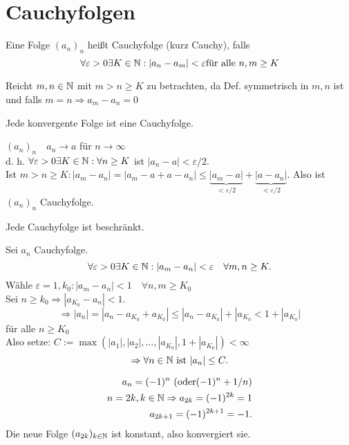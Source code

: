 \section{Cauchyfolgen}
\begin{defi}[Cauchyfolge]
	Eine Folge \((a_n)_n\) heißt Cauchyfolge (kurz Cauchy), falls
	\[\forall \varepsilon>0 \exists K\in\mathbb{N}: |a_n-a_m| < \varepsilon \text{für alle } n,m\geq K \]
\end{defi}
\begin{bem}
	Reicht \(m,n\in\mathbb{N}\) mit \( m>n\geq K \) zu betrachten, da Def. symmetrisch in \(m,n\) ist und falls \(m=n \Rightarrow a_m-a_n=0\)
\end{bem}
\begin{lem}
	Jede konvergente Folge ist eine Cauchyfolge.
\end{lem}
\begin{bew}
	\( (a_n)_n \quad a_n \rightarrow a \) für \(n\rightarrow\infty\) \\
	d. h. \( \forall \varepsilon > 0 \exists K \in \mathbb{N}: \forall n\geq K \) ist \( |a_n-a| < \varepsilon/2 \).\\
	Ist \(m>n\geq K: |a_m -a_n| = |a_m-a+a-a_n| \leq \underbrace{|a_m-a|}_{<\varepsilon/2} + \underbrace{ |a-a_n| }_{<\varepsilon/2}. \) Also ist \((a_n)_n\) Cauchyfolge.
\end{bew}
\begin{lem}
	Jede Cauchyfolge ist beschränkt.
\end{lem}
\begin{bew}
	Sei \(a_n\) Cauchyfolge. 
	\[ \forall \varepsilon > 0 \exists K\in\mathbb{N}:|a_m-a_n| < \varepsilon \quad \forall m,n\geq K. \]
	Wähle \(\varepsilon = 1, k_0: |a_m-a_n| < 1 \quad \forall n,m\geq K_0 \)\\
	Sei \(n \geq k_0 \Rightarrow |a_{K_0} - a_n| < 1. \)
	\[ \Rightarrow |a_n| = |a_n - a_{K_0} + a_{K_0}| \leq |a_n - a_{K_0}| + |a_{K_0} < 1 + |a_{K_0}| \] für alle \(n\geq K_0\)\\
	Also setze: \( C := \max ( |a_1|,|a_2|,\ldots,|a_{K_0}|,1+|a_{K_0}| ) < \infty \) 
	\[ \Rightarrow \forall n\in\mathbb{N} \text{ ist } |a_n| \leq C. \]
\end{bew}
\begin{bsp}
	\begin{align*}
		a_n = (-1)^n \text{ (oder} (-1)^n + 1/n \text{)}\\
		n = 2k, k\in\mathbb{N} \Rightarrow a_{2k} = (-1)^{2k} = 1\\
		a_{2k+1} = (-1)^{2k+1} = -1.
	\end{align*}
	Die neue Folge \( (a_{2k})_{k\in\mathbb{N}} \) ist konstant, also konvergiert sie.
\end{bsp}
